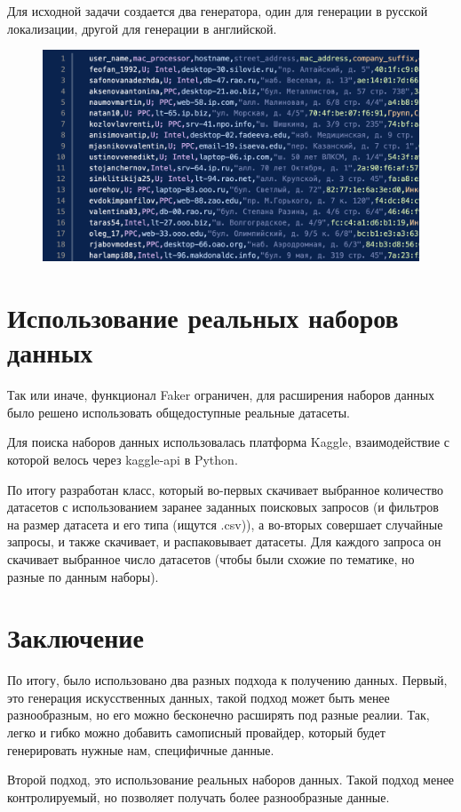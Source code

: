 \documentclass{article}
\begin{document}
Для исходной задачи создается два генератора, один для генерации в русской локализации, другой для генерации в английской.

\begin{figure}[hbt!]
\centering
\includegraphics[width=0.8\linewidth]{figures/generated_data_example.png}
\end{figure}

\section*{Использование реальных наборов данных}
Так или иначе, функционал Faker ограничен, для расширения наборов данных было решено использовать общедоступные реальные датасеты.

Для поиска наборов данных использовалась платформа Kaggle, взаимодействие с которой велось через kaggle-api в Python.

По итогу разработан класс, который во-первых скачивает выбранное количество датасетов с использованием заранее заданных поисковых запросов (и фильтров на размер датасета и его типа (ищутся .csv)), а во-вторых совершает случайные запросы, и также скачивает, и распаковывает датасеты. Для каждого запроса он скачивает выбранное число датасетов (чтобы были схожие по тематике, но разные по данным наборы).

\section*{Заключение}
По итогу, было использовано два разных подхода к получению данных. Первый, это генерация искусственных данных, такой подход может быть менее разнообразным, но его можно бесконечно расширять под разные реалии. Так, легко и гибко можно добавить самописный провайдер, который будет генерировать нужные нам, специфичные данные.

Второй подход, это использование реальных наборов данных. Такой подход менее контролируемый, но позволяет получать более разнообразные данные.
\end{document}
